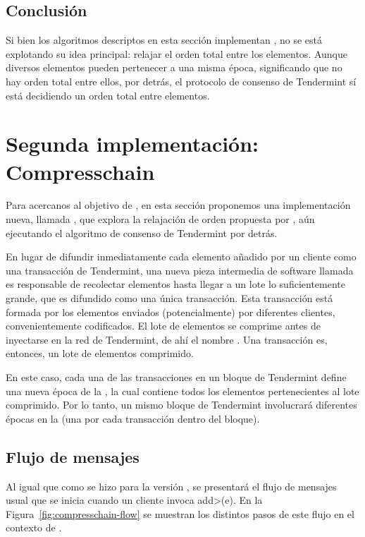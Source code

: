 \subsection{Conclusión}
Si bien los algoritmos descriptos en esta sección implementan \setchain, no se está explotando su idea
principal: relajar el orden total entre los elementos.
%
Aunque diversos elementos pueden pertenecer a una misma época, significando que no hay orden total
entre ellos, por detrás, el protocolo de consenso de Tendermint sí está decidiendo un orden total
entre elementos.
%
%



\section{Segunda implementación: Compresschain}\label{sec:compresschain}

Para acercanos al objetivo de \setchain, en esta sección proponemos
%
una implementación nueva, llamada \compresschain, que explora
la relajación de orden propuesta por \setchain, aún ejecutando el algoritmo de
consenso de Tendermint por detrás.
%

En lugar de difundir inmediatamente cada elemento añadido por un cliente como una
transacción de Tendermint, una nueva pieza intermedia de software llamada \collector
es responsable de recolectar elementos hasta llegar a un lote lo suficientemente grande,
que es difundido como una única transacción.
%
Esta transacción está formada por los elementos
enviados (potencialmente) por diferentes clientes, convenientemente codificados.
%
El lote de elementos se comprime antes de inyectarse en la red de Tendermint, de ahí el nombre
\compresschain.
%
Una transacción es, entonces, un lote de elementos comprimido.

En este caso, cada una de las transacciones en un bloque de Tendermint define una
nueva época de la \setchain, la cual contiene todos los elementos pertenecientes al lote
comprimido.
Por lo tanto, un mismo bloque de Tendermint involucrará diferentes épocas en la \setchain
(una por cada transacción dentro del bloque).

\subsection{Flujo de mensajes}
Al igual que como se hizo para la versión \vanilla, se presentará el flujo de mensajes usual
que se inicia cuando un cliente invoca \<add>(e).
En la Figura~\ref{fig:compresschain-flow} se muestran los distintos pasos de
este flujo en el contexto de \compresschain.
%

